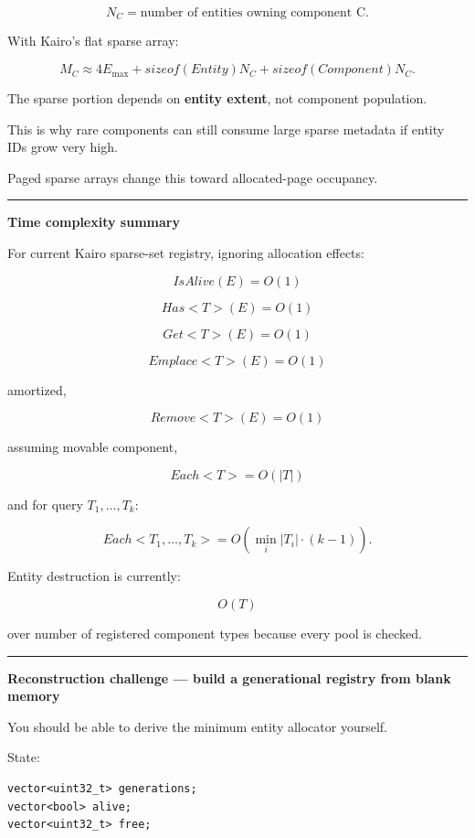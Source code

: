 \[
N_C
=
\text{number of entities owning component C}.
\]

With Kairo's flat sparse array:

\[
M_C
\approx
4E_{\max}
+
sizeof(Entity)N_C
+
sizeof(Component)N_C.
\]

The sparse portion depends on \textbf{entity extent}, not component population.

This is why rare components can still consume large sparse metadata if entity IDs grow very high.

Paged sparse arrays change this toward allocated-page occupancy.

\begin{center}\rule{0.5\linewidth}{0.5pt}\end{center}

\textbf{Time complexity summary}

For current Kairo sparse-set registry, ignoring allocation effects:

\[
IsAlive(E)=O(1)
\]

\[
Has<T>(E)=O(1)
\]

\[
Get<T>(E)=O(1)
\]

\[
Emplace<T>(E)=O(1)
\]

amortized,

\[
Remove<T>(E)=O(1)
\]

assuming movable component,

\[
Each<T>=O(|T|)
\]

and for query \(T_1,\dots,T_k\):

\[
Each<T_1,\dots,T_k>
=
O(
\min_i|T_i|
\cdot(k-1)
).
\]

Entity destruction is currently:

\[
O(T)
\]

over number of registered component types because every pool is checked.

\begin{center}\rule{0.5\linewidth}{0.5pt}\end{center}

\textbf{Reconstruction challenge --- build a generational registry from blank memory}

You should be able to derive the minimum entity allocator yourself.

State:

\begin{verbatim}
vector<uint32_t> generations;
vector<bool> alive;
vector<uint32_t> free;
\end{verbatim}

